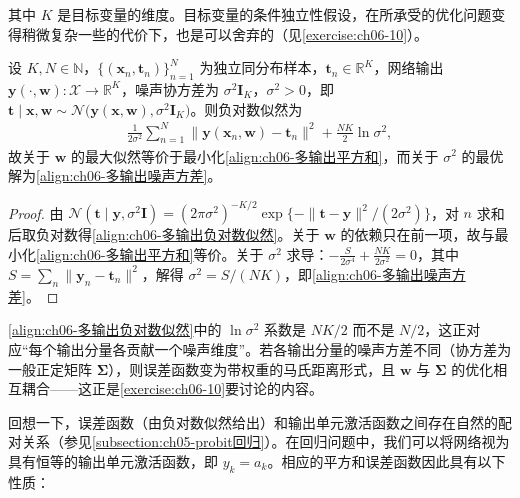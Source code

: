 \documentclass[../../main.tex]{subfiles}
\begin{document}
其中 $K$ 是目标变量的维度。目标变量的条件独立性假设，在所承受的优化问题变得稍微复杂一些的代价下，也是可以舍弃的（见\cref{exercise:ch06-10}）。

\begin{proposition}[多输出回归的误差函数与噪声方差]\label{proposition:ch06-多输出回归}
设 $K,N\in\mathbb{N}$，$\{(\boldsymbol{x}_{n},\boldsymbol{t}_{n})\}_{n=1}^{N}$ 为独立同分布样本，$\boldsymbol{t}_{n}\in\mathbb{R}^{K}$，网络输出 $\boldsymbol{y}(\cdot,\boldsymbol{w}):\mathcal{X}\to\mathbb{R}^{K}$，噪声协方差为 $\sigma^{2}\boldsymbol{I}_{K}$，$\sigma^{2}>0$，即 $\boldsymbol{t}\mid\boldsymbol{x},\boldsymbol{w}\sim\mathcal{N}\bigl(\boldsymbol{y}(\boldsymbol{x},\boldsymbol{w}),\sigma^{2}\boldsymbol{I}_{K}\bigr)$。则负对数似然为
\begin{align}
\frac{1}{2\sigma^{2}}\sum_{n=1}^{N}\bigl\|\boldsymbol{y}(\boldsymbol{x}_n,\boldsymbol{w})-\boldsymbol{t}_n\bigr\|^{2}+\frac{NK}{2}\ln\sigma^{2},
\label{align:ch06-多输出负对数似然}
\end{align}
故关于 $\boldsymbol{w}$ 的最大似然等价于最小化\eqref{align:ch06-多输出平方和}，而关于 $\sigma^{2}$ 的最优解为\eqref{align:ch06-多输出噪声方差}。
\end{proposition}

\begin{proof}
由 $\mathcal{N}(\boldsymbol{t}\mid\boldsymbol{y},\sigma^{2}\boldsymbol{I})=(2\pi\sigma^{2})^{-K/2}\exp\{-\|\boldsymbol{t}-\boldsymbol{y}\|^{2}/(2\sigma^{2})\}$，对 $n$ 求和后取负对数得\eqref{align:ch06-多输出负对数似然}。关于 $\boldsymbol{w}$ 的依赖只在前一项，故与最小化\eqref{align:ch06-多输出平方和}等价。关于 $\sigma^{2}$ 求导：$-\frac{S}{2\sigma^{4}}+\frac{NK}{2\sigma^{2}}=0$，其中 $S=\sum_{n}\|\boldsymbol{y}_n-\boldsymbol{t}_n\|^{2}$，解得 $\sigma^{2}=S/(NK)$，即\eqref{align:ch06-多输出噪声方差}。
\end{proof}

\begin{remark}\eqref{align:ch06-多输出负对数似然}中的 $\ln\sigma^{2}$ 系数是 $NK/2$ 而不是 $N/2$，这正对应“每个输出分量各贡献一个噪声维度”。若各输出分量的噪声方差不同（协方差为一般正定矩阵 $\boldsymbol{\Sigma}$），则误差函数变为带权重的马氏距离形式，且 $\boldsymbol{w}$ 与 $\boldsymbol{\Sigma}$ 的优化相互耦合——这正是\cref{exercise:ch06-10}要讨论的内容。
\end{remark}

回想一下，误差函数（由负对数似然给出）和输出单元激活函数之间存在自然的配对关系（参见\cref{subsection:ch05-probit回归}）。在回归问题中，我们可以将网络视为具有恒等的输出单元激活函数，即 $y_k=a_k$。相应的平方和误差函数因此具有以下性质：
\end{document}
